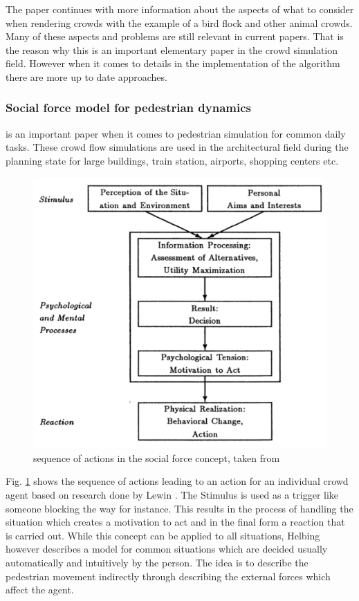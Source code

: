 \documentclass{acmsiggraph}               %
\begin{document}
The paper continues with more information about the aspects of what to consider when rendering crowds with the example of a bird flock and other animal crowds. Many of these aspects and problems are still relevant in current papers. That is the reason why this is an important elementary paper in the crowd simulation field. However when it comes to details in the implementation of the algorithm there are more up to date approaches. 

\subsubsection{Social force model for pedestrian dynamics}\cite{helbing_social_1995} is an important paper when it comes to pedestrian simulation for common daily tasks. These crowd flow simulations are used in the architectural field during the planning state for large buildings, train station, airports, shopping centers etc. 
\begin{figure}[h]
  \centering
  \includegraphics[width=1\linewidth]{images/helbingSocialForceConceptScheme.png}
  \caption{sequence of actions in the social force concept, taken from \protect\cite{helbing_social_1995}}
  \label{fig:helbingSchema}
\end{figure}
Fig. \ref{fig:helbingSchema} shows the sequence of actions leading to an action for an individual crowd agent based on research done by Lewin \cite{lewin_field_1951}. The Stimulus is used as a trigger like someone blocking the way for instance. This results in the process of handling the situation which creates a motivation to act and in the final form a reaction that is carried out. While this concept can be applied to all situations, Helbing however describes a model for common situations which are decided usually automatically and intuitively by the person. The idea is to describe the pedestrian movement indirectly through describing the external forces which affect the agent. 
\end{document}
